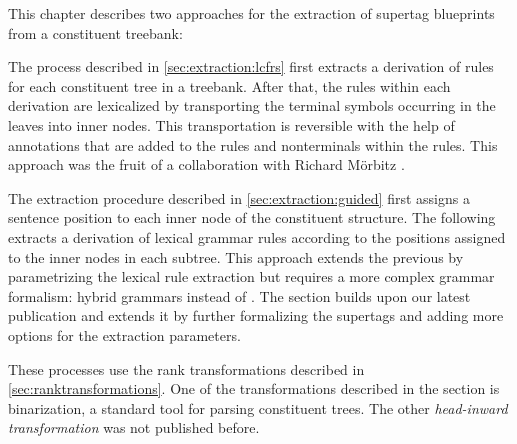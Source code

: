 \documentclass[../document.tex]{subfiles}
\begin{document}
    This chapter describes two approaches for the extraction of supertag blueprints from a constituent treebank:
    \begin{compactenum}
        \item
            The process described in \cref{sec:extraction:lcfrs} first extracts a derivation of  rules for each constituent tree in a treebank.
            After that, the rules within each derivation are lexicalized by transporting the terminal symbols occurring in the leaves into inner nodes.
            This transportation is reversible with the help of annotations that are added to the rules and nonterminals within the rules.
            This approach was the fruit of a collaboration with Richard Mörbitz \citep{MoeRup20,RupMoe21}.
        \item
            The extraction procedure described in \cref{sec:extraction:guided} first assigns a sentence position to each inner node of the constituent structure.
            The following extracts a derivation of lexical grammar rules according to the positions assigned to the inner nodes in each subtree.
            This approach extends the previous by parametrizing the lexical rule extraction but requires a more complex grammar formalism: hybrid grammars instead of .
            The section builds upon our latest publication \citep{Rup22} and extends it by further formalizing the supertags and adding more options for the extraction parameters.
    \end{compactenum}
    These processes use the rank transformations described in \cref{sec:ranktransformations}.
    One of the transformations described in the section is binarization, a standard tool for parsing constituent trees.
    The other \emph{head-inward transformation} was not published before.


    
    
    

\end{document}
